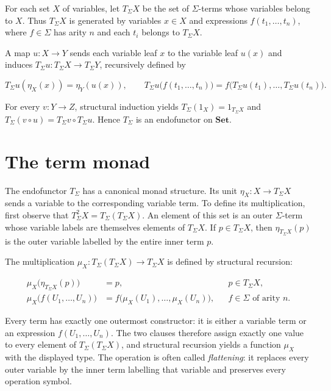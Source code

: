 \documentclass[11pt]{article}
\theoremstyle{definition}
\begin{document}
For each set \(X\) of variables, let \(T_\Sigma X\) be the set of
\(\Sigma\)-terms whose variables belong to \(X\). Thus \(T_\Sigma X\) is
generated by variables \(x\in X\) and expressions
\(f(t_1,\ldots,t_n)\), where \(f\in\Sigma\) has arity \(n\) and each
\(t_i\) belongs to \(T_\Sigma X\).

A map \(u:X\to Y\) sends each variable leaf \(x\) to the variable leaf
\(u(x)\) and induces \(T_\Sigma u:T_\Sigma X\to T_\Sigma Y\), recursively
defined by

\[
T_\Sigma u(\eta_X(x))=\eta_Y(u(x)),\qquad
T_\Sigma u\bigl(f(t_1,\ldots,t_n)\bigr)
=f\bigl(T_\Sigma u(t_1),\ldots,T_\Sigma u(t_n)\bigr).
\]

For every \(v:Y\to Z\), structural induction yields
\(T_\Sigma(1_X)=1_{T_\Sigma X}\) and
\(T_\Sigma(v\circ u)=T_\Sigma v\circ T_\Sigma u\). Hence \(T_\Sigma\) is an
endofunctor on \(\mathbf{Set}\).

\section{The term monad}\label{the-term-monad}

The endofunctor \(T_\Sigma\) has a canonical monad structure. Its unit
\(\eta_X:X\to T_\Sigma X\) sends a variable to the corresponding variable
term. To define its multiplication, first observe that
\(T_\Sigma^2X=T_\Sigma(T_\Sigma X)\). An element of this set is an outer
\(\Sigma\)-term whose variable labels are themselves elements of
\(T_\Sigma X\). If \(p\in T_\Sigma X\), then
\(\eta_{T_\Sigma X}(p)\) is the outer variable labelled by the entire inner
term \(p\).

The multiplication \(\mu_X:T_\Sigma(T_\Sigma X)\to T_\Sigma X\) is defined
by structural recursion:

\[
\begin{aligned}
\mu_X\bigl(\eta_{T_\Sigma X}(p)\bigr)&=p,
&&p\in T_\Sigma X,\\
\mu_X\bigl(f(U_1,\ldots,U_n)\bigr)
&=f\bigl(\mu_X(U_1),\ldots,\mu_X(U_n)\bigr),
&&f\in\Sigma\text{ of arity }n.
\end{aligned}
\]

Every term has exactly one outermost constructor: it is either a variable term
or an expression \(f(U_1,\ldots,U_n)\). The two clauses therefore assign
exactly one value to every element of \(T_\Sigma(T_\Sigma X)\), and structural
recursion yields a function \(\mu_X\) with the displayed type. The operation is
often called \emph{flattening}: it replaces every outer variable by the inner
term labelling that variable and preserves every operation symbol.
\end{document}
